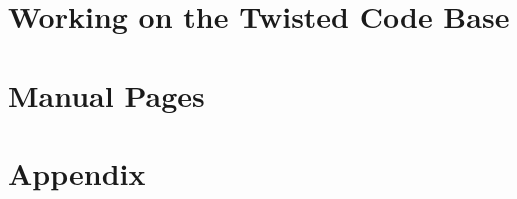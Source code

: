 \documentclass[oneside]{book}
\begin{document}
\chapter{Working on the Twisted Code Base}






\chapter{Manual Pages}














\chapter{Appendix}




\end{document}
